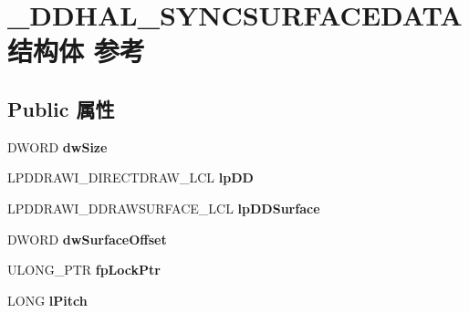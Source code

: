 \hypertarget{struct___d_d_h_a_l___s_y_n_c_s_u_r_f_a_c_e_d_a_t_a}{}\section{\+\_\+\+D\+D\+H\+A\+L\+\_\+\+S\+Y\+N\+C\+S\+U\+R\+F\+A\+C\+E\+D\+A\+T\+A结构体 参考}
\label{struct___d_d_h_a_l___s_y_n_c_s_u_r_f_a_c_e_d_a_t_a}
\subsection*{Public 属性}
\begin{DoxyCompactItemize}
\item 
\mbox{\label{struct___d_d_h_a_l___s_y_n_c_s_u_r_f_a_c_e_d_a_t_a_afd87f5d4d8fa1980ee3f2fc0f8c4c303}} 
D\+W\+O\+RD {\bfseries dw\+Size}
\item 
\mbox{\label{struct___d_d_h_a_l___s_y_n_c_s_u_r_f_a_c_e_d_a_t_a_a989f0a37b20ea969475d4063671971ab}} 
L\+P\+D\+D\+R\+A\+W\+I\+\_\+\+D\+I\+R\+E\+C\+T\+D\+R\+A\+W\+\_\+\+L\+CL {\bfseries lp\+DD}
\item 
\mbox{\label{struct___d_d_h_a_l___s_y_n_c_s_u_r_f_a_c_e_d_a_t_a_a47e6bffcb6fd10d46ff006eeabb9ec41}} 
L\+P\+D\+D\+R\+A\+W\+I\+\_\+\+D\+D\+R\+A\+W\+S\+U\+R\+F\+A\+C\+E\+\_\+\+L\+CL {\bfseries lp\+D\+D\+Surface}
\item 
\mbox{\label{struct___d_d_h_a_l___s_y_n_c_s_u_r_f_a_c_e_d_a_t_a_a6483cf52c97d59c50e68ee73ca6f4cab}} 
D\+W\+O\+RD {\bfseries dw\+Surface\+Offset}
\item 
\mbox{\label{struct___d_d_h_a_l___s_y_n_c_s_u_r_f_a_c_e_d_a_t_a_a16e640376bad7f6e119ba34106c153d4}} 
U\+L\+O\+N\+G\+\_\+\+P\+TR {\bfseries fp\+Lock\+Ptr}
\item 
\mbox{\label{struct___d_d_h_a_l___s_y_n_c_s_u_r_f_a_c_e_d_a_t_a_abe25feaa0d1305b0e3f2b8d9c18bfd18}} 
L\+O\+NG {\bfseries l\+Pitch}

\end{DoxyCompactItemize}
